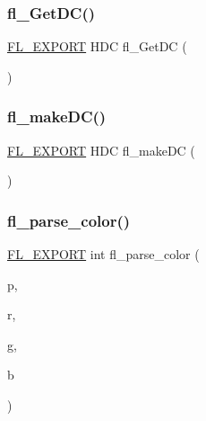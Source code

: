 \mbox{\label{win32_8_h_ab8c64c29fd758c51d58e815420d3fe61}} 
\subsubsection{\texorpdfstring{fl\+\_\+\+Get\+D\+C()}{fl\_GetDC()}}
{\footnotesize\ttfamily \hyperlink{_fl___export_8_h_aa9ba29a18aee9d738370a06eeb4470fc}{F\+L\+\_\+\+E\+X\+P\+O\+RT} H\+DC fl\+\_\+\+Get\+DC (\begin{DoxyParamCaption}\item[{\hyperlink{mac_8_h_a213656d363e884b651cc92f58e863fc6}{Window}}]{ }\end{DoxyParamCaption})}

\mbox{\label{win32_8_h_ae0ea9637a51cabdbf0ba5405c8d915c5}} 
\subsubsection{\texorpdfstring{fl\+\_\+make\+D\+C()}{fl\_makeDC()}}
{\footnotesize\ttfamily \hyperlink{_fl___export_8_h_aa9ba29a18aee9d738370a06eeb4470fc}{F\+L\+\_\+\+E\+X\+P\+O\+RT} H\+DC fl\+\_\+make\+DC (\begin{DoxyParamCaption}\item[{H\+B\+I\+T\+M\+AP}]{ }\end{DoxyParamCaption})}

\mbox{\label{win32_8_h_a0a5c5c56a06c3e23e509e6c0125e95e7}} 
\subsubsection{\texorpdfstring{fl\+\_\+parse\+\_\+color()}{fl\_parse\_color()}}
{\footnotesize\ttfamily \hyperlink{_fl___export_8_h_aa9ba29a18aee9d738370a06eeb4470fc}{F\+L\+\_\+\+E\+X\+P\+O\+RT} int fl\+\_\+parse\+\_\+color (\begin{DoxyParamCaption}\item[{const char $\ast$}]{p,  }\item[{\hyperlink{fl__types_8h_a65f85814a8290f9797005d3b28e7e5fc}{uchar} \&}]{r,  }\item[{\hyperlink{fl__types_8h_a65f85814a8290f9797005d3b28e7e5fc}{uchar} \&}]{g,  }\item[{\hyperlink{fl__types_8h_a65f85814a8290f9797005d3b28e7e5fc}{uchar} \&}]{b }\end{DoxyParamCaption})}

